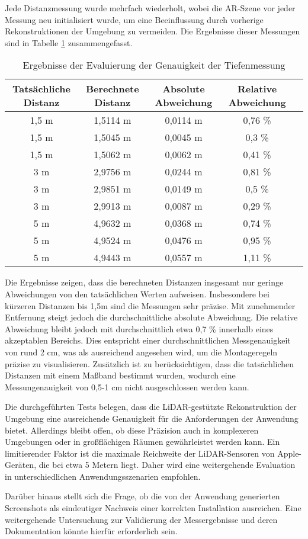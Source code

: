 Jede Distanzmessung wurde mehrfach wiederholt, wobei die AR-Szene vor jeder Messung neu initialisiert wurde, um eine Beeinflussung durch vorherige Rekonstruktionen der Umgebung zu vermeiden. Die Ergebnisse dieser Messungen sind in Tabelle \ref{tab:DistanceMeasurement} zusammengefasst.

\begin{table}[ht]
    \centering
    \begin{tabular}{ccccl}
        \hline
        Tatsächliche Distanz & Berechnete Distanz & Absolute Abweichung & Relative Abweichung \\
        \hline
        1,5 m & 1,5114 m & 0,0114 m & 0,76 \% \\
        1,5 m & 1,5045 m & 0,0045 m & 0,3 \% \\
        1,5 m & 1,5062 m & 0,0062 m & 0,41 \% \\
        \hline
        3 m & 2,9756 m & 0,0244 m & 0,81 \% \\
        3 m & 2,9851 m & 0,0149 m & 0,5 \% \\
        3 m & 2,9913 m & 0,0087 m & 0,29 \% \\
        \hline
        5 m & 4,9632 m & 0,0368 m & 0,74 \% \\
        5 m & 4,9524 m & 0,0476 m & 0,95 \% \\
        5 m & 4,9443 m & 0,0557 m & 1,11 \% \\
        \hline
    \end{tabular}
    \caption{Ergebnisse der Evaluierung der Genauigkeit der Tiefenmessung}
    \label{tab:DistanceMeasurement}
\end{table}

Die Ergebnisse zeigen, dass die berechneten Distanzen insgesamt nur geringe Abweichungen von den tatsächlichen Werten aufweisen. Insbesondere bei kürzeren Distanzen bis 1,5m sind die Messungen sehr präzise. Mit zunehmender Entfernung steigt jedoch die durchschnittliche absolute Abweichung. Die relative Abweichung bleibt jedoch mit durchschnittlich etwa 0,7 \% innerhalb eines akzeptablen Bereichs. Dies entspricht einer durchschnittlichen Messgenauigkeit von rund 2 cm, was als ausreichend angesehen wird, um die Montageregeln präzise zu visualisieren. Zusätzlich ist zu berücksichtigen, dass die tatsächlichen Distanzen mit einem Maßband bestimmt wurden, wodurch eine Messungenauigkeit von 0,5-1 cm nicht ausgeschlossen werden kann.

Die durchgeführten Tests belegen, dass die LiDAR-gestützte Rekonstruktion der Umgebung eine ausreichende Genauigkeit für die Anforderungen der Anwendung bietet. Allerdings bleibt offen, ob diese Präzision auch in komplexeren Umgebungen oder in großflächigen Räumen gewährleistet werden kann. Ein limitierender Faktor ist die maximale Reichweite der LiDAR-Sensoren von Apple-Geräten, die bei etwa 5 Metern liegt. Daher wird eine weitergehende Evaluation in unterschiedlichen Anwendungsszenarien empfohlen. \cite{appledevdoc}

Darüber hinaus stellt sich die Frage, ob die von der Anwendung generierten Screenshots als eindeutiger Nachweis einer korrekten Installation ausreichen. Eine weitergehende Untersuchung zur Validierung der Messergebnisse und deren Dokumentation könnte hierfür erforderlich sein. 
